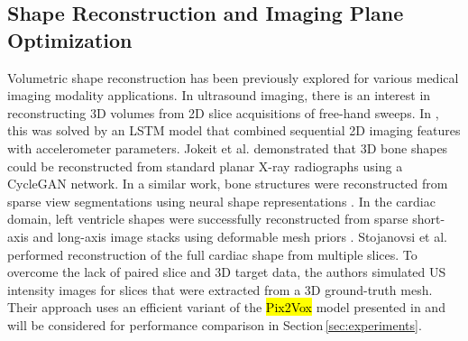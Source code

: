    {}




    \subsection{Shape Reconstruction and Imaging Plane Optimization}
    \label{sec:shape_recon_plane_optimization}
     Volumetric shape reconstruction has been previously explored for various medical imaging modality applications.
    In ultrasound imaging, there is an interest in reconstructing 3D volumes from 2D slice acquisitions of free-hand sweeps. In \cite{luo2022deep}, this was solved by an LSTM model that combined sequential 2D imaging features with accelerometer parameters.
    Jokeit et al. \cite{jokeit2022mesh} demonstrated that 3D bone shapes could be reconstructed from standard planar X-ray radiographs using a CycleGAN network.
    In a similar work, bone structures were reconstructed from sparse view segmentations using neural shape representations \cite{amiranashvili2022learning}.
    In the cardiac domain, left ventricle shapes were successfully reconstructed from sparse short-axis and long-axis image stacks using deformable mesh priors \cite{beetz2022reconstructing}.
    Stojanovsi et al. \cite{stojanovski2022efficient} performed reconstruction of the full cardiac shape from multiple slices.
    To overcome the lack of paired slice and 3D target data, the authors simulated US intensity images for slices that were extracted from a 3D ground-truth mesh. Their approach uses an efficient variant of the \hl{Pix2Vox} %
    model presented in \cite{xie2019pix2vox} and will be considered for performance comparison in Section\,\ref{sec:experiments}.


